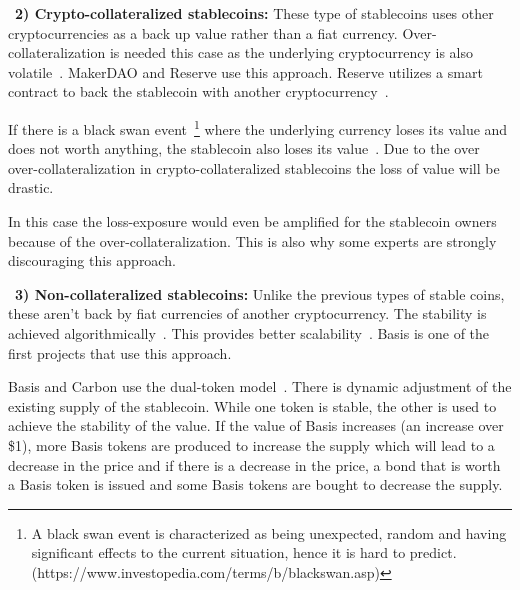
~\textbf{2) Crypto-collateralized stablecoins:} These type of stablecoins uses other cryptocurrencies as a back up value rather than a fiat currency. Over-collateralization is needed this case as the underlying cryptocurrency is also volatile~\cite{linkedin}. MakerDAO and Reserve use this approach. Reserve utilizes a smart contract to back the stablecoin with another cryptocurrency~\cite{cointelegraph}.

If there is a black swan event~\footnote{A black swan event is characterized as being unexpected, random and having significant effects to the current situation, hence it is hard to predict.(https://www.investopedia.com/terms/b/blackswan.asp)} where the underlying currency loses its value and does not worth anything, the stablecoin also loses its value~\cite{coinsexplained}.  Due to the over over-collateralization in crypto-collateralized stablecoins the loss of value will be drastic.

In this case the loss-exposure would even be amplified for the stablecoin owners because of the over-collateralization. This is also why some experts are strongly discouraging this approach.


~\textbf{3) Non-collateralized stablecoins:} Unlike the previous types of stable coins, these aren't back by fiat currencies of another cryptocurrency. The stability is achieved algorithmically~\cite{linkedin}. This provides better scalability~\cite{report}. Basis is one of the first projects that use this approach.

Basis and Carbon use the dual-token model~\cite{cryptoinsider}. There is dynamic adjustment of the existing supply of the stablecoin. While one token is stable, the other is used to achieve the stability of the value. If the value of Basis increases (an increase over \$1), more Basis tokens are produced to increase the supply which will lead to a decrease in the price and if there is a decrease in the price, a bond that is worth a Basis token is issued and some Basis tokens are bought to decrease the supply.~\cite{euromoney}




